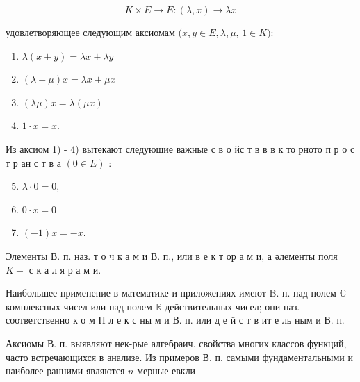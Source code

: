 \documentclass[10pt]{article}
\begin{document}
\[

K \times E \rightarrow E:(\lambda, x) \rightarrow \lambda x

\]



удовлетворяющее следующим аксиомам $(x, y \in E, \lambda, \mu$, $1 \in K):$



\begin{enumerate}

  \item $\lambda(x+y)=\lambda x+\lambda y$



  \item $(\lambda+\mu) x=\lambda x+\mu x$



  \item $(\lambda \mu) x=\lambda(\mu x)$



  \item $1 \cdot x=x$.



\end{enumerate}



Из аксиом 1) - 4) вытекают следующие важные с в о йс т в в в к то рното п р о с т р ан с т в а $(0 \in E)$ :



\begin{enumerate}

  \setcounter{enumi}{4}

  \item $\lambda \cdot 0=0$,



  \item $0 \cdot x=0$



  \item $(-1) x=-x$.



\end{enumerate}



Элементы В. п. наз. т о ч к а м и В. п., или в е к т ор а м и, а әлементы поля $K-$ с к а л я р а м и.



Наибольшее применение в математике и приложениях имеют B. п. над полем $\mathbb{C}$ комплексных чисел или над полем $\mathbb{R}$ действительных чисел; они наз. соответственно к о м П л е к с ны м и В. п. или д е й с т в ит е ль ным и В. п.



Аксиомы В. п. выявляют нек-рые алгебраич. свойства многих классов функций, часто встречающихся в анализе. Из примеров В. п. самыми фундаментальными и наиболее ранними являются $n$-мерные евкли-
\end{document}
